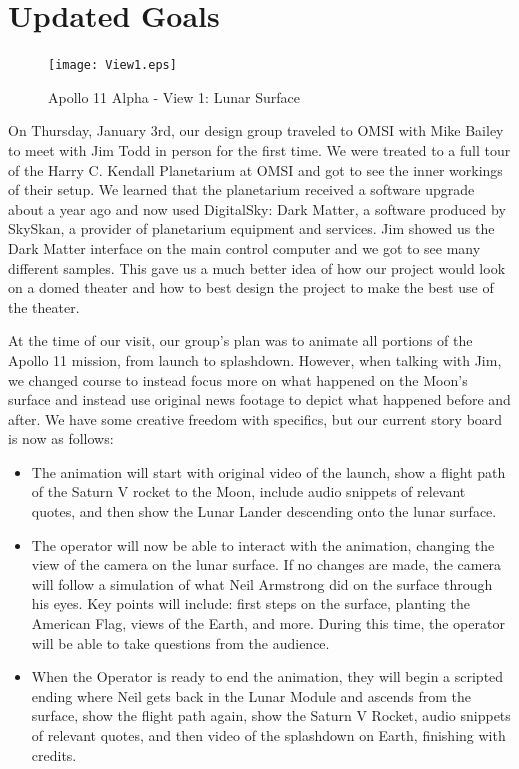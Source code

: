 \documentclass[onecolumn, draftclsnofoot,10pt, compsoc]{IEEEtran}
\begin{document}
\clearpage


\section{Updated Goals}

\begin{figure}
    \texttt{[image: View1.eps]}
    \caption{Apollo 11 Alpha - View 1: Lunar Surface}
    \label{fig:View 1}
\end{figure}



On Thursday, January 3rd, our design group traveled to OMSI with Mike Bailey to meet with Jim Todd in person for the first time. We were treated to a full tour of the Harry C. Kendall Planetarium at OMSI and got to see the inner workings of their setup. We learned that the planetarium received a software upgrade about a year ago and now used DigitalSky: Dark Matter, a software produced by SkySkan, a provider of planetarium equipment and services. Jim showed us the Dark Matter interface on the main control computer and we got to see many different samples. This gave us a much better idea of how our project would look on a domed theater and how to best design the project to make the best use of the theater. 

At the time of our visit, our group's plan was to animate all portions of the Apollo 11 mission, from launch to splashdown. However, when talking with Jim, we changed course to instead focus more on what happened on the Moon's surface and instead use original news footage to depict what happened before and after. We have some creative freedom with specifics, but our current story board is now as follows: 

\begin{itemize}
    \item The animation will start with original video of the launch, show a flight path of the Saturn V rocket to the Moon, include audio snippets of relevant quotes, and then show the Lunar Lander descending onto the lunar surface.
    
    \item The operator will now be able to interact with the animation, changing the view of the camera on the lunar surface. If no changes are made, the camera will follow a simulation of what Neil Armstrong did on the surface through his eyes. Key points will include: first steps on the surface, planting the American Flag, views of the Earth, and more. During this time, the operator will be able to take questions from the audience. 
    \item When the Operator is ready to end the animation, they will begin a scripted ending where Neil gets back in the Lunar Module and ascends from the surface, show the flight path again, show the Saturn V Rocket, audio snippets of relevant quotes, and then video of the splashdown on Earth, finishing with credits. 
\end{itemize}
\end{document}
